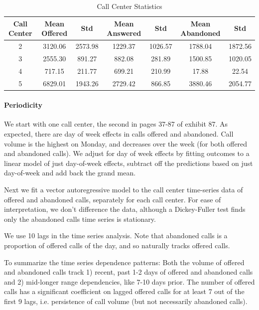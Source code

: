 \documentclass[manuscript,screen,authorversion]{acmart}
\begin{document}
\begin{table}[htb]
\centering
\caption{Call Center Statistics}
\label{tab:call_center_stats}
\begin{tabular}{ccccccc}
\hline
\textbf{Call Center} & \textbf{Mean Offered} & \textbf{Std } & \textbf{Mean Answered} & \textbf{Std } & \textbf{Mean Abandoned} & \textbf{Std } \\
\hline
2 & 3120.06 & 2573.98 & 1229.37 & 1026.57 & 1788.04 & 1872.56 \\
3 & 2555.30 & 891.27 & 882.08 & 281.89 & 1500.85 & 1020.05 \\
4 & 717.15 & 211.77 & 699.21 & 210.99 & 17.88 & 22.54 \\
5 & 6829.01 & 1943.26 & 2729.42 & 866.85 & 3880.46 & 2054.77 \\
\hline
\end{tabular}
\end{table}



\paragraph{Periodicity}
We start with one call center, the second in pages 37-87 of exhibit 87. 
As expected, there are day of week effects in calls offered and abandoned. Call volume is the highest on Monday, and decreases over the week (for both offered and abandoned calls). 
We adjust for day of week effects by fitting outcomes to a linear model of just day-of-week effects, subtract off the predictions based on just day-of-week and add back the grand mean. 

Next we fit a vector autoregressive model to the call center time-series data of offered and abandoned calls, separately for each call center. For ease of interpretation, we don’t difference the data, although a Dickey-Fuller test finds only the abandoned calls time series is stationary. 

We use 10 lags in the time series analysis. Note that abandoned calls is a proportion of offered calls of the day, and so naturally tracks offered calls. 

To summarize the time series dependence patterns: Both the volume of offered and abandoned calls track 1) recent, past 1-2 days of offered and abandoned calls and 2) mid-longer range dependencies, like 7-10 days prior. The number of offered calls has a significant coefficient on lagged offered calls for at least 7 out of the first 9 lags, i.e. persistence of call volume (but not necessarily abandoned calls). 
\end{document}
